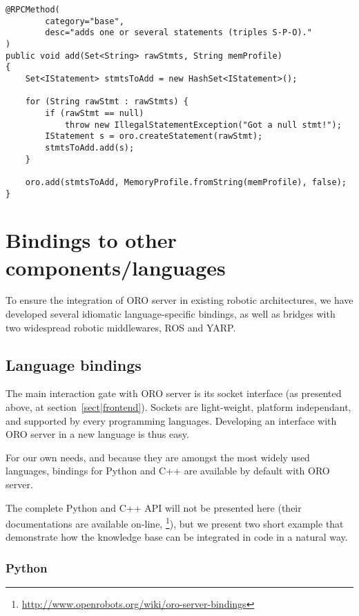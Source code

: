 \lstset{language=java}
\begin{lstlisting}[caption=The {\tt add} method from ORO {\tt BaseModule}, 
                   label = code|oro-add, 
                   morekeywords={@RPCMethod}]
@RPCMethod(
        category="base",
        desc="adds one or several statements (triples S-P-O)."
)
public void add(Set<String> rawStmts, String memProfile)
{
    Set<IStatement> stmtsToAdd = new HashSet<IStatement>();
    
    for (String rawStmt : rawStmts) {
        if (rawStmt == null)
            throw new IllegalStatementException("Got a null stmt!");
        IStatement s = oro.createStatement(rawStmt);
        stmtsToAdd.add(s);
    }
    
    oro.add(stmtsToAdd, MemoryProfile.fromString(memProfile), false);
}
\end{lstlisting}


\section{Bindings to other components/languages}
\label{sect|interfacing}

To ensure the integration of ORO server in existing robotic architectures, we
have developed several idiomatic language-specific bindings, as well as bridges
with two widespread robotic middlewares, ROS and YARP.

\subsection{Language bindings}
\label{sect|bindings}

The main interaction gate with ORO server is its socket interface (as presented
above, at section~\ref{sect|frontend}). Sockets are light-weight, platform
independant, and supported by every programming languages.  Developing an
interface with ORO server in a new language is thus easy.

For our own needs, and because they are amongst the most widely used languages,
bindings for Python and C++ are available by default with ORO server.

The complete Python and C++ API will not be presented here (their
documentations are available on-line,
\footnote{\url{http://www.openrobots.org/wiki/oro-server-bindings}}), but we
present two short example that demonstrate how the knowledge base can be
integrated in code in a natural way.

\subsubsection{Python}
\label{sect|python-bindings}

